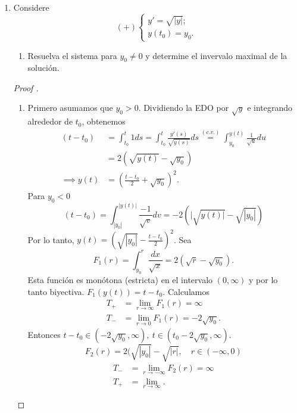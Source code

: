 \begin{enumerate}
		\item Considere
		\[
		(+) \begin{cases}
			y' = \sqrt{|y|}; \\
			y(t_0) = y_0.
		\end{cases}
		\]
		\begin{enumerate}
			\item Resuelva el sistema para $y_0 \neq 0$ y determine el invervalo maximal de la solución.
		\end{enumerate}
		\begin{proof}[Proof ]~
			\begin{enumerate}
				\item Primero asumamos que $y_0 > 0$. Dividiendo la EDO por $\sqrt{y}$ e integrando alrededor de $t_0$, obtenemos
				\begin{align*}
					(t-t_0) & = \int_{t_0}^{t} 1 ds = \int_{t_0}^{t} \frac{y'(s)}{\sqrt{y(s)}} ds \stackrel{(c.v.)}{=} \int_{y_0}^{y(t)} \frac{1}{\sqrt{u}} du \\
					& = 2 (\sqrt{y(t)} - \sqrt{y_0}) \\
					\implies y(t) & = \left( \frac{t-t_0}{2} + \sqrt{y_0} \right)^2
				.\end{align*}
				\noindent Para $y_0 < 0$
				\[
				(t-t_0) = \int_{|y_0|}^{|y(t)|} \frac{-1}{\sqrt{v}} dv = -2 (|\sqrt{y(t)|} - \sqrt{|y_0|})
				\]
				\noindent Por lo tanto, $y(t) = \left( \sqrt{|y_0|} - \frac{t-t_0}{2} \right)^2$. Sea 
				\[
				F_1(r) = \int_{y_0}^{r} \frac{dx}{\sqrt{x}} = 2 (\sqrt{r} - \sqrt{y_0}).
				\]
				\noindent Esta función es monótona (estricta) en el intervalo $(0,\infty)$ y por lo tanto biyectiva. $F_1(y(t)) = t-t_0$. Calculamos
				\begin{align*}
					T_{+} & = \lim_{r \to \infty} F_1(r) = \infty \\
					T_{-} & = \lim_{r \to 0} F_1(r) = -2 \sqrt{y_0}
				.\end{align*}
				\noindent Entonces $t-t_0 \in (-2 \sqrt{y_0},\infty),\ t \in (t_0-2 \sqrt{y_0}, \infty)$.
				\[
				F_2(r) = 2 ( \sqrt{|y_0|} - \sqrt{|r|}, \quad r \in (-\infty, 0)
				\]
				\begin{align*}
					T_{-} & = \lim_{r \to -\infty} F_2(r) = \infty \\
					T_{+} & = \lim_{r \to \infty} 
				.\end{align*}
			\end{enumerate}
		\end{proof}
	\end{enumerate}
